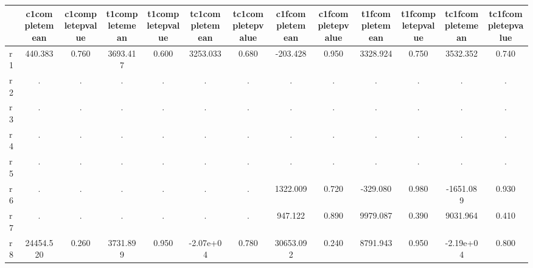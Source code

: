 \begin{table}[htbp]
\begin{tabular}{lcccccccccccc} \hline \hline
 & c1completemean  & c1completepvalue  & t1completemean  & t1completepvalue  & tc1completemean  & tc1completepvalue  & c1fcompletemean  & c1fcompletepvalue  & t1fcompletemean  & t1fcompletepvalue  & tc1fcompletemean  & tc1fcompletepvalue  \\  \hline 
r1 &   440.383 &     0.760 &  3693.417 &     0.600 &  3253.033 &     0.680 &  -203.428 &     0.950 &  3328.924 &     0.750 &  3532.352 &     0.740 \\  
r2 &         . &         . &         . &         . &         . &         . &         . &         . &         . &         . &         . &         . \\  
r3 &         . &         . &         . &         . &         . &         . &         . &         . &         . &         . &         . &         . \\  
r4 &         . &         . &         . &         . &         . &         . &         . &         . &         . &         . &         . &         . \\  
r5 &         . &         . &         . &         . &         . &         . &         . &         . &         . &         . &         . &         . \\  
r6 &         . &         . &         . &         . &         . &         . &  1322.009 &     0.720 &  -329.080 &     0.980 & -1651.089 &     0.930 \\  
r7 &         . &         . &         . &         . &         . &         . &   947.122 &     0.890 &  9979.087 &     0.390 &  9031.964 &     0.410 \\  
r8 & 24454.520 &     0.260 &  3731.899 &     0.950 & -2.07e+04 &     0.780 & 30653.092 &     0.240 &  8791.943 &     0.950 & -2.19e+04 &     0.800 \\  
\hline \hline \end{tabular}
\end{table}
